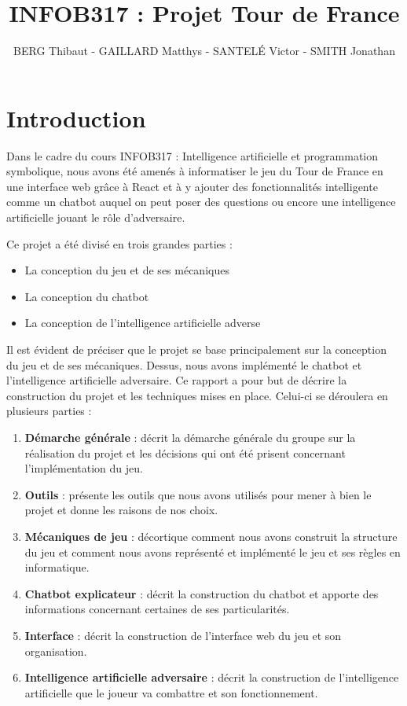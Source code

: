 \documentclass[a4paper, 11pt]{article}
\title{INFOB317 : Projet Tour de France}
\author{BERG Thibaut - GAILLARD Matthys - SANTELÉ Victor - SMITH Jonathan}
\begin{document}
\maketitle

\newpage

\section{Introduction}

Dans le cadre du cours INFOB317 : Intelligence artificielle et programmation symbolique, nous avons été amenés à informatiser le jeu du Tour de France en une interface web grâce à React et à y ajouter des fonctionnalités intelligente comme un chatbot auquel on peut poser des questions ou encore une intelligence artificielle jouant le rôle d'adversaire.\newline

Ce projet a été divisé en trois grandes parties :
\begin{itemize}
    \item La conception du jeu et de ses mécaniques
    \item La conception du chatbot
    \item La conception de l'intelligence artificielle adverse\newline
\end{itemize}

Il est évident de préciser que le projet se base principalement sur la conception du jeu et de ses mécaniques. Dessus, nous avons implémenté le chatbot et l'intelligence artificielle adversaire. Ce rapport a pour but de décrire la construction du projet et les techniques mises en place. Celui-ci se déroulera en plusieurs parties : 

\begin{enumerate}
	\item \textbf{Démarche générale} : décrit la démarche générale du groupe sur la réalisation du projet et les décisions qui ont été prisent concernant l'implémentation du jeu.
	\item \textbf{Outils} : présente les outils que nous avons utilisés pour mener à bien le projet et donne les raisons de nos choix.
	\item \textbf{Mécaniques de jeu} : décortique comment nous avons construit la structure du jeu et comment nous avons représenté et implémenté le jeu et ses règles en informatique.
	\item \textbf{Chatbot explicateur} : décrit la construction du chatbot et apporte des informations concernant certaines de ses particularités.
	\item \textbf{Interface} : décrit la construction de l'interface web du jeu et son organisation.
	\item \textbf{Intelligence artificielle adversaire} : décrit la construction de l'intelligence artificielle que le joueur va combattre et son fonctionnement.\newline
\end{enumerate}
\end{document}

